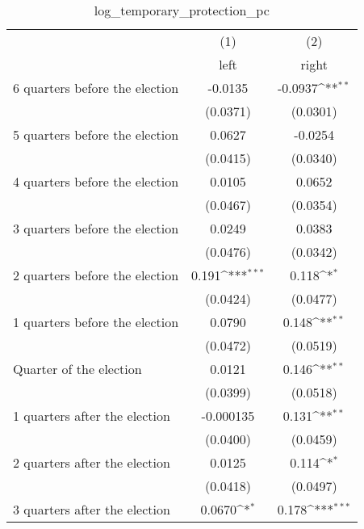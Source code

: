 \begin{table}[htbp]\centering
\def\sym#1{\ifmmode^{#1}\else\(^{#1}\)\fi}
\caption{log\_temporary\_protection\_pc}
\begin{tabular}{l*{2}{c}}
\hline\hline
                    &\multicolumn{1}{c}{(1)}&\multicolumn{1}{c}{(2)}\\
                    &\multicolumn{1}{c}{left}&\multicolumn{1}{c}{right}\\
\hline
 6 quarters before the election&     -0.0135         &     -0.0937\sym{**} \\
                    &    (0.0371)         &    (0.0301)         \\
[1em]
 5 quarters before the election&      0.0627         &     -0.0254         \\
                    &    (0.0415)         &    (0.0340)         \\
[1em]
 4 quarters before the election&      0.0105         &      0.0652         \\
                    &    (0.0467)         &    (0.0354)         \\
[1em]
 3 quarters before the election&      0.0249         &      0.0383         \\
                    &    (0.0476)         &    (0.0342)         \\
[1em]
 2 quarters before the election&       0.191\sym{***}&       0.118\sym{*}  \\
                    &    (0.0424)         &    (0.0477)         \\
[1em]
 1 quarters before the election&      0.0790         &       0.148\sym{**} \\
                    &    (0.0472)         &    (0.0519)         \\
[1em]
Quarter of the election&      0.0121         &       0.146\sym{**} \\
                    &    (0.0399)         &    (0.0518)         \\
[1em]
 1 quarters after the election&   -0.000135         &       0.131\sym{**} \\
                    &    (0.0400)         &    (0.0459)         \\
[1em]
 2 quarters after the election&      0.0125         &       0.114\sym{*}  \\
                    &    (0.0418)         &    (0.0497)         \\
[1em]
 3 quarters after the election&      0.0670\sym{*}  &       0.178\sym{***}\\

\end{tabular}
\end{table}

